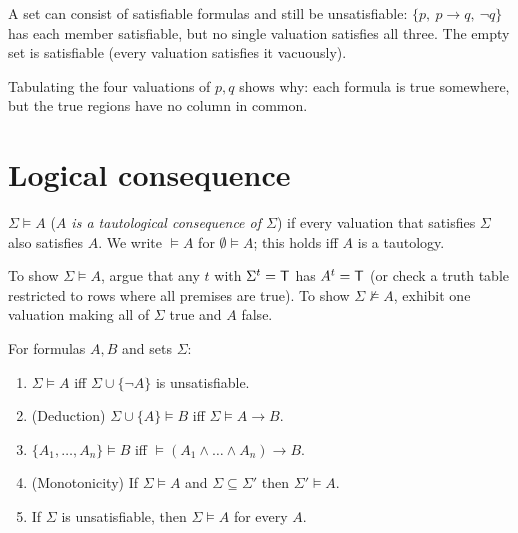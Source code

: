 \begin{important}
A set can consist of satisfiable formulas and still be unsatisfiable:
$\{p,\ p\to q,\ \neg q\}$ has each member satisfiable, but no single valuation satisfies
all three. The empty set is satisfiable (every valuation satisfies it vacuously).
\end{important}

Tabulating the four valuations of $p,q$ shows why: each formula is true somewhere, but the
true regions have no column in common.
\begin{center}
\end{center}

\section{Logical consequence}

\begin{definition}
$\Sigma \models A$ (\emph{$A$ is a tautological consequence of $\Sigma$}) if every
valuation that satisfies $\Sigma$ also satisfies $A$. We write $\models A$ for
$\emptyset\models A$; this holds iff $A$ is a tautology.
\end{definition}

To show $\Sigma\models A$, argue that any $t$ with $\Sigma^t=\mathsf{T}$ has $A^t=\mathsf{T}$ (or check a
truth table restricted to rows where all premises are true). To show
$\Sigma\not\models A$, exhibit one valuation making all of $\Sigma$ true and $A$ false.

\begin{theorem}
For formulas $A,B$ and sets $\Sigma$:
\begin{enumerate}
  \item $\Sigma\models A$ iff $\Sigma\cup\{\neg A\}$ is unsatisfiable.
  \item (Deduction) $\Sigma\cup\{A\}\models B$ iff $\Sigma\models A\to B$.
  \item $\{A_1,\dots,A_n\}\models B$ iff $\models (A_1\land\dots\land A_n)\to B$.
  \item (Monotonicity) If $\Sigma\models A$ and $\Sigma\subseteq\Sigma'$ then
        $\Sigma'\models A$.
  \item If $\Sigma$ is unsatisfiable, then $\Sigma\models A$ for every $A$.
\end{enumerate}
\end{theorem}

